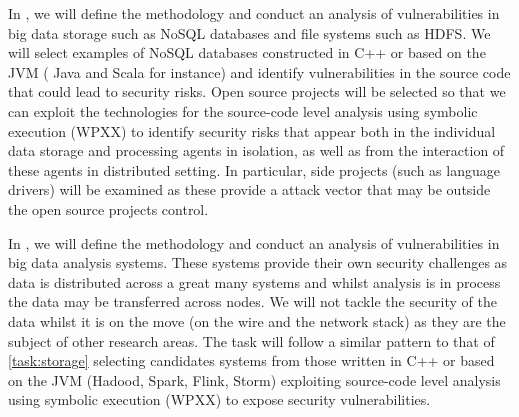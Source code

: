 \begin{Workpackage}{\thewpno}
\begin{Task}
\TaskResults{%
}
\TaskHeader{}
In \theTask, we will define the methodology and conduct an analysis of vulnerabilities in big data storage such as NoSQL databases and file systems such as HDFS.  We will select examples of  NoSQL databases constructed in C++ or  based on the JVM ( Java and Scala for instance) and identify vulnerabilities in the source code that could lead to security risks. Open source projects will be selected so that we can exploit the technologies for the source-code level analysis using symbolic execution (WPXX) to identify security risks that appear both in the individual data storage and processing agents in isolation, as well as from the interaction of these agents in distributed setting. In particular, side projects (such as language drivers) will be examined as these provide a attack vector that may be outside the open source projects control. 
 \end{Task}

 \begin{Task}
 
 \TaskResults{%
 }
 \TaskHeader{}
 In \theTask, we will define the methodology and conduct an analysis of vulnerabilities in big data analysis systems.  These systems provide their own security challenges as data is distributed across a great many systems and whilst analysis is in process the data may be transferred across nodes.  We will not tackle the security of the data whilst it is on the move (on the wire and the network stack) as they are the subject of other research areas.  The task will follow a similar pattern to that of \ref{task:storage} selecting candidates systems from those written in C++ or based on the JVM (Hadood, Spark, Flink, Storm) exploiting source-code level analysis using symbolic execution (WPXX) to expose security vulnerabilities.
\end{Task}
 
\begin{Task}
  

\end{Task}
\end{Workpackage}
